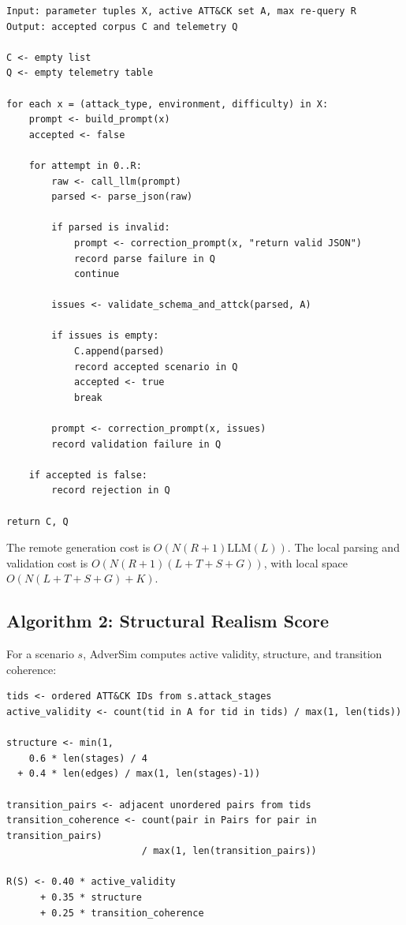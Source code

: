 \begin{verbatim}
Input: parameter tuples X, active ATT&CK set A, max re-query R
Output: accepted corpus C and telemetry Q

C <- empty list
Q <- empty telemetry table

for each x = (attack_type, environment, difficulty) in X:
    prompt <- build_prompt(x)
    accepted <- false

    for attempt in 0..R:
        raw <- call_llm(prompt)
        parsed <- parse_json(raw)

        if parsed is invalid:
            prompt <- correction_prompt(x, "return valid JSON")
            record parse failure in Q
            continue

        issues <- validate_schema_and_attck(parsed, A)

        if issues is empty:
            C.append(parsed)
            record accepted scenario in Q
            accepted <- true
            break

        prompt <- correction_prompt(x, issues)
        record validation failure in Q

    if accepted is false:
        record rejection in Q

return C, Q
\end{verbatim}

The remote generation cost is
$O(N(R+1)\mathrm{LLM}(L))$. The local parsing and validation cost is
$O(N(R+1)(L+T+S+G))$, with local space $O(N(L+T+S+G)+K)$.

\subsection{Algorithm 2: Structural Realism Score}

For a scenario $s$, AdverSim computes active validity, structure, and transition
coherence:

\begin{verbatim}
tids <- ordered ATT&CK IDs from s.attack_stages
active_validity <- count(tid in A for tid in tids) / max(1, len(tids))

structure <- min(1,
    0.6 * len(stages) / 4
  + 0.4 * len(edges) / max(1, len(stages)-1))

transition_pairs <- adjacent unordered pairs from tids
transition_coherence <- count(pair in Pairs for pair in transition_pairs)
                        / max(1, len(transition_pairs))

R(S) <- 0.40 * active_validity
      + 0.35 * structure
      + 0.25 * transition_coherence
\end{verbatim}

